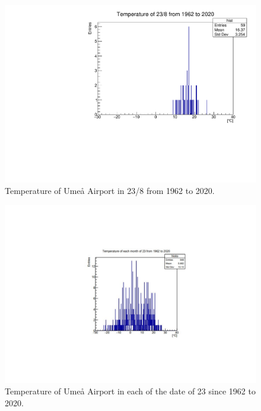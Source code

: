 \documentclass[a4, 12pt]{article}
\begin{document}
\begin{figure}[H]
\centering
\includegraphics[scale=0.6]{chrisFig1.pdf}
\caption{Temperature of Umeå Airport in 23/8 from 1962 to 2020.}
\end{figure}


\begin{figure}[H]
\centering
\includegraphics[scale=0.7]{chrisFig3.pdf}
\caption{ Temperature of Umeå Airport in each of the date of 23 since 1962 to 2020.}
\end{figure}




\end{document}
